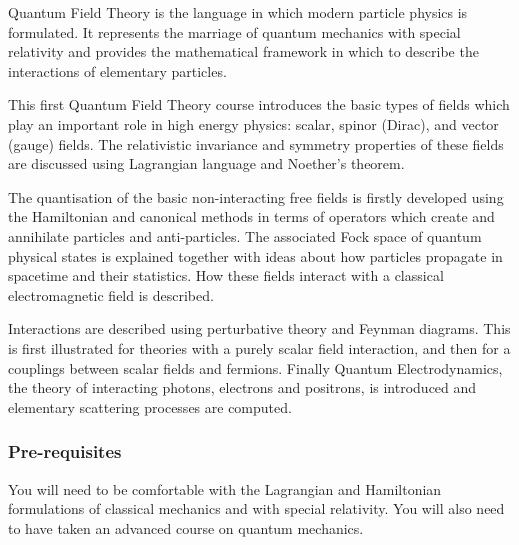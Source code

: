 \documentclass[a4paper]{article}
\begin{document}
\maketitle
{\small
\setlength{\parindent}{0em}
\setlength{\parskip}{1em}

Quantum Field Theory is the language in which modern particle physics is formulated. It represents the marriage of quantum mechanics with special relativity and provides the mathematical framework in which to describe the interactions of elementary particles.

This first Quantum Field Theory course introduces the basic types of fields which play an important role in high energy physics: scalar, spinor (Dirac), and vector (gauge) fields. The relativistic invariance and symmetry properties of these fields are discussed using Lagrangian language and Noether's theorem.

The quantisation of the basic non-interacting free fields is firstly developed using the Hamiltonian and canonical methods in terms of operators which create and annihilate particles and anti-particles. The associated Fock space of quantum physical states is explained together with ideas about how particles propagate in spacetime and their statistics. How these fields interact with a classical electromagnetic field is described.

Interactions are described using perturbative theory and Feynman diagrams. This is first illustrated for theories with a purely scalar field interaction, and then for a couplings between scalar fields and fermions. Finally Quantum Electrodynamics, the theory of interacting photons, electrons and positrons, is introduced and elementary scattering processes are computed.


\subsubsection*{Pre-requisites}
You will need to be comfortable with the Lagrangian and Hamiltonian formulations of classical mechanics and with special relativity. You will also need to have taken an advanced course on quantum mechanics.
}
\tableofcontents
\end{document}
